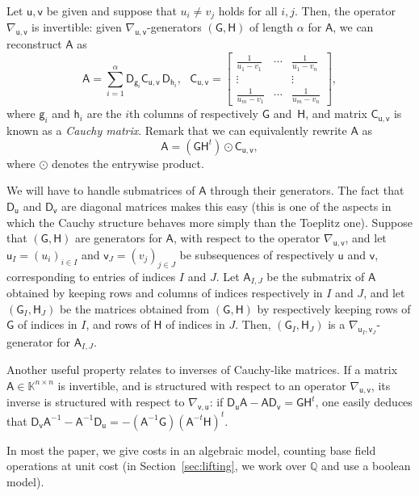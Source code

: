 \documentclass{sig-alternate}
\newcommand{\vg}{\ensuremath{\mathsf{g}}}
\newcommand{\vh}{\ensuremath{\mathsf{h}}}
\newcommand{\vu}{\ensuremath{\mathsf{u}}}
\newcommand{\vv}{\ensuremath{\mathsf{v}}}
\newcommand{\mA}{\ensuremath{\mathsf{A}}}
\newcommand{\mC}{\ensuremath{\mathsf{C}}}
\newcommand{\mD}{\ensuremath{\mathsf{D}}}
\newcommand{\mG}{\ensuremath{\mathsf{G}}}
\newcommand{\mH}{\ensuremath{\mathsf{H}}}
\newcommand{\K}{\ensuremath{\mathbb{K}}}
\newcommand{\Q}{\ensuremath{\mathbb{Q}}}
\begin{document}
Let $\vu,\vv$ be given and suppose that $u_i \ne v_j$ holds for all
$i,j$. Then, the operator $\nabla_{\vu,\vv}$ is invertible: given
$\nabla_{\vu,\vv}$-generators $(\mG,\mH)$ of length $\alpha$ for $\mA$, we can reconstruct $\mA$ as
\begin{equation}\label{eq:recA}
\mA = \sum_{i=1}^\alpha
\mD_{\vg_i} 
\mC_{\vu,\vv}\,\mD_{\vh_i},\ \ \ 
\mC_{\vu,\vv}=\begin{bmatrix}
\frac 1{u_1-v_1} & \cdots & \frac 1{u_1-v_n}\\
\vdots & & \vdots \\
\frac 1{u_m-v_1} & \cdots & \frac 1{u_m-v_n}
\end{bmatrix}, 
\end{equation}
where $\vg_i$ and $\vh_i$ are the $i$th columns of respectively $\mG$
and~$\mH$, and  matrix $\mC_{\vu,\vv}$ is known as a {\em Cauchy
  matrix}. Remark that we can
equivalently rewrite $\mA$ as
\begin{equation}\label{eq:recA2}
\mA= (\mG \mH^t) \odot \mC_{\vu,\vv},
\end{equation}
where $\odot$ denotes the entrywise product.

We will have to handle submatrices of $\mA$ through their
generators. The fact that $\mD_{\vu}$ and $\mD_{\vv}$ are diagonal
matrices makes this easy (this is one of the aspects in which the
Cauchy structure behaves more simply than the Toeplitz one).  Suppose
that $(\mG,\mH)$ are generators for $\mA$, with respect to the
operator $\nabla_{\vu,\vv}$, and let $\vu_I=(u_i)_{i \in I}$ and
$\vv_J=(v_j)_{j \in J}$ be subsequences of respectively $\vu$ and
$\vv$, corresponding to entries of indices $I$ and $J$. Let
$\mA_{I,J}$ be the submatrix of $\mA$ obtained by keeping rows and
columns of indices respectively in $I$ and $J$, and let
$(\mG_I,\mH_J)$ be the matrices obtained from $(\mG,\mH)$ by
respectively keeping rows of $\mG$ of indices in $I$, and rows of
$\mH$ of indices in $J$. Then, $(\mG_I,\mH_J)$ is a
$\nabla_{\vu_I,\vv_J}$-generator for $\mA_{I,J}$.

Another useful property relates to inverses of Cauchy-like matrices.
If a matrix $\mA \in \K^{n\times n}$ is invertible, and is structured
with respect to an operator $\nabla_{\vu,\vv}$, its inverse is
structured with respect to $\nabla_{\vv,\vu}$: if $\mD_\vu \mA - \mA
\mD_\vv = \mG \mH^t$, one easily deduces that $\mD_\vv \mA^{-1} - \mA^{-1}
\mD_\vu = - (\mA^{-1} \mG) (\mA^{-t} \mH)^t$.


\smallskip{}  In most the paper, we
give costs in an algebraic model, counting base field operations at
unit cost (in Section~\ref{sec:lifting}, we work over $\Q$ and use 
a boolean model).
\end{document}
